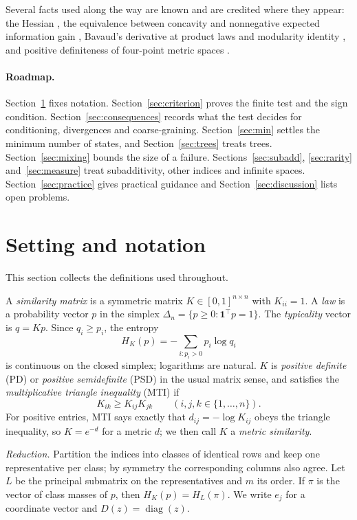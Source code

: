 \documentclass[11pt,a4paper]{article}
\theoremstyle{remark}
\DeclareMathOperator{\diag}{diag}
\newcommand{\one}{\mathbf 1}
\begin{document}
Several facts used along the way are known and are credited where they appear: the Hessian \cite{gait}, the equivalence between concavity and nonnegative expected information gain \cite{miller}, Bavaud's derivative at product laws and modularity identity \cite{bavaud}, and positive definiteness of four-point metric spaces \cite{meckes}.

\paragraph{Roadmap.} Section~\ref{sec:setting} fixes notation. Section~\ref{sec:criterion} proves the finite test and the sign condition. Section~\ref{sec:consequences} records what the test decides for conditioning, divergences and coarse-graining. Section~\ref{sec:min} settles the minimum number of states, and Section~\ref{sec:trees} treats trees. Section~\ref{sec:mixing} bounds the size of a failure. Sections~\ref{sec:subadd}, \ref{sec:rarity} and~\ref{sec:measure} treat subadditivity, other indices and infinite spaces. Section~\ref{sec:practice} gives practical guidance and Section~\ref{sec:discussion} lists open problems.

\section{Setting and notation}\label{sec:setting}
This section collects the definitions used throughout.

A \emph{similarity matrix} is a symmetric matrix $K\in[0,1]^{n\times n}$ with $K_{ii}=1$. A \emph{law} is a probability vector $p$ in the simplex $\Delta_n=\{p\ge0:\one^\top p=1\}$. The \emph{typicality} vector is $q=Kp$. Since $q_i\ge p_i$, the entropy
\begin{equation}\label{eq:H}
 H_K(p)=-\sum_{i:p_i>0}p_i\log q_i
\end{equation}
is continuous on the closed simplex; logarithms are natural. $K$ is \emph{positive definite} (PD) or \emph{positive semidefinite} (PSD) in the usual matrix sense, and satisfies the \emph{multiplicative triangle inequality} (MTI) if
\begin{equation}\label{eq:mti}
 K_{ik}\ge K_{ij}K_{jk}\qquad (i,j,k\in\{1,\ldots,n\}).
\end{equation}
For positive entries, MTI says exactly that $d_{ij}=-\log K_{ij}$ obeys the triangle inequality, so $K=e^{-d}$ for a metric $d$; we then call $K$ a \emph{metric similarity}.

\emph{Reduction.} Partition the indices into classes of identical rows and keep one representative per class; by symmetry the corresponding columns also agree. Let $L$ be the principal submatrix on the representatives and $m$ its order. If $\pi$ is the vector of class masses of $p$, then $H_K(p)=H_L(\pi)$. We write $e_j$ for a coordinate vector and $D(z)=\diag(z)$.
\end{document}
